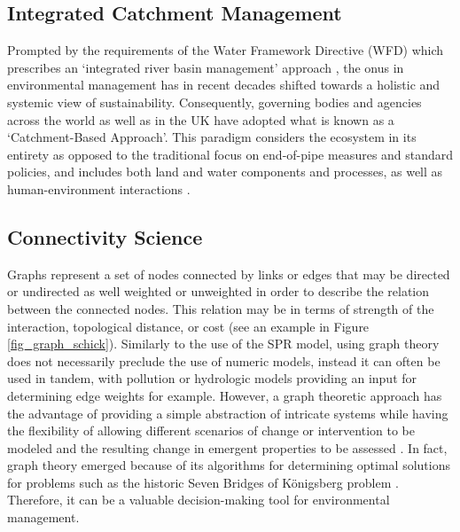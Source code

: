 \documentclass{article}
\begin{document}
\subsection{Integrated Catchment Management}
Prompted by the requirements of the Water Framework Directive (WFD) which prescribes an ‘integrated river basin management’ approach \citep{EuropeanCommission2000DIRECTIVEPolicy}, the onus in environmental management has in recent decades shifted towards a holistic and systemic view of sustainability. Consequently, governing bodies and agencies across the world as well as in the UK have adopted what is known as a ‘Catchment-Based Approach’\citep{Collins2010TrustingWales,DEFRA2013CatchmentEnvironment}. This paradigm considers the ecosystem in its entirety as opposed to the traditional focus on end-of-pipe measures and standard policies, and includes both land and water components and processes, as well as human-environment interactions \citep{Voulvoulis2016TheImplementation}. 

\subsection{Connectivity Science}
Graphs represent a set of nodes connected by links or edges that may be directed or undirected as well weighted or unweighted in order to describe the relation between the connected nodes. This relation may be in terms of strength of the interaction, topological distance, or cost (see an example in Figure \ref{fig_graph_schick}). Similarly to the use of the SPR model, using graph theory does not necessarily preclude the use of numeric models, instead it can often be used in tandem, with pollution or hydrologic models providing an input for determining edge weights for example. However, a graph theoretic approach has the advantage of providing a simple abstraction of intricate systems while having the flexibility of allowing different scenarios of change or intervention to be modeled and the resulting change in emergent properties to be assessed \citep{OHanley2005OptimizingBarriers}. In fact, graph theory emerged because of its algorithms for determining optimal solutions for problems such as the historic Seven Bridges of Königsberg problem \citep{Bullmore2009ComplexSystems}. Therefore, it can be a valuable decision-making tool for environmental management.
\end{document}
